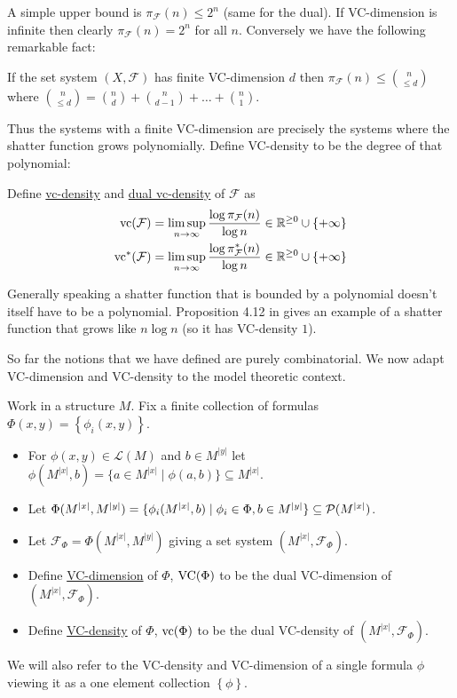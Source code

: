 \documentclass{amsart}
\newcommand{\F}{\mathcal F}
\renewcommand{\LL}{\mathcal L}
\newcommand{\curly}[1]{\left\{#1\right\}}
\newcommand{\defn}{\underline}
\begin{document}
A simple upper bound is $\pi_\F(n) \leq 2^n$ (same for the dual).
If VC-dimension is infinite then clearly $\pi_\F(n) = 2^n$ for all $n$. Conversely we have the following remarkable fact:
\begin{Theorem} 
  If the set system $(X, \F)$ has finite VC-dimension $d$ then $\pi_\F(n) \leq {n \choose \leq d}$ where
  ${n \choose \leq d} = {n \choose d} + {n \choose d - 1} + \ldots + {n \choose 1}$.    
\end{Theorem}

Thus the systems with a finite VC-dimension are precisely the systems where the shatter function grows polynomially.
Define VC-density to be the degree of that polynomial:
\begin{Definition}
  Define \defn{vc-density} and \defn{dual vc-density} of $\F$ as
  \begin{align*}
	  \vc(\F) &= \limsup_{n \to \infty}\frac{\log \pi_\F(n)}{\log n} \in \R^{\geq 0} \cup \curly{+\infty}\\
	  \vc^*(\F) &= \limsup_{n \to \infty}\frac{\log \pi^*_\F(n)}{\log n}\in \R^{\geq 0} \cup \curly{+\infty}
  \end{align*}
\end{Definition}

Generally speaking a shatter function that is bounded by a polynomial doesn't itself have to be a polynomial.
Proposition 4.12 in \cite{density} gives an example of a shatter function that grows like $n \log n$ (so it has VC-density $1$).

So far the notions that we have defined are purely combinatorial.
We now adapt VC-dimension and VC-density to the model theoretic context.

\begin{Definition}
  Work in a structure $M$.
  Fix a finite collection of formulas $\Phi(x, y) = \curly{\phi_i(x, y)}$.

  \begin{itemize}
	  \item For $\phi(x, y) \in \LL(M)$ and $b \in M^{|y|}$ let $\phi(M^{|x|}, b) = \{a \in M^{|x|} \mid \phi(a, b)\} \subseteq M^{|x|}$.
  \item Let $\Phi(M^{|x|}, M^{|y|})= \{\phi_i(M^{|x|}, b) \mid \phi_i \in \Phi, b \in M^{|y|}\} \subseteq \mathcal P(M^{|x|})$.
  \item Let $\F_\Phi = \Phi(M^{|x|}, M^{|y|})$ giving a set system $(M^{|x|}, \F_\Phi)$.
  \item Define \defn{VC-dimension} of $\Phi$, $\operatorname{VC}(\Phi)$ to be the dual VC-dimension of $(M^{|x|}, \F_\Phi)$.
  \item Define \defn{VC-density} of $\Phi$, $\operatorname{vc}(\Phi)$ to be the dual VC-density of $(M^{|x|}, \F_\Phi)$.
  \end{itemize}

  We will also refer to the VC-density and VC-dimension of a single formula $\phi$
  viewing it as a one element collection $\curly{\phi}$.
\end{Definition}
\end{document}
